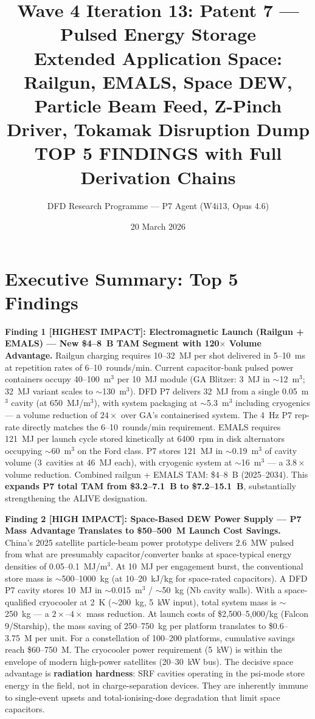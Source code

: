 \documentclass[11pt]{article}
\title{Wave 4 Iteration 13: Patent 7 --- Pulsed Energy Storage\\
\large Extended Application Space: Railgun, EMALS, Space DEW,\\
Particle Beam Feed, Z-Pinch Driver, Tokamak Disruption Dump\\[4pt]
{\normalsize TOP 5 FINDINGS with Full Derivation Chains}}
\author{DFD Research Programme --- P7 Agent (W4i13, Opus 4.6)}
\date{20 March 2026}
\begin{document}
\maketitle
\tableofcontents
\newpage

\section*{Executive Summary: Top 5 Findings}

\begin{tcolorbox}[colback=blue!5!white, colframe=blue!60!black,
  title=\textbf{W4i13 P7 --- Top 5 Findings (Ranked by Impact)}]

\textbf{Finding 1 [HIGHEST IMPACT]: Electromagnetic Launch (Railgun + EMALS) --- New \$4--8~B TAM Segment with 120$\times$ Volume Advantage.}
Railgun charging requires 10--32~MJ per shot delivered in 5--10~ms at
repetition rates of 6--10~rounds/min. Current capacitor-bank pulsed power
containers occupy 40--100~m$^3$ per 10~MJ module (GA Blitzer: 3~MJ in
$\sim$12~m$^3$; 32~MJ variant scales to $\sim$130~m$^3$). DFD P7 delivers
32~MJ from a single 0.05~m$^3$ cavity (at 650~MJ/m$^3$), with system
packaging at $\sim$5.3~m$^3$ including cryogenics --- a volume reduction
of $24\times$ over GA's containerised system. The 4~Hz P7 rep-rate
directly matches the 6--10~rounds/min requirement.
EMALS requires 121~MJ per launch cycle stored kinetically at 6400~rpm in
disk alternators occupying $\sim$60~m$^3$ on the Ford class. P7 stores
121~MJ in $\sim$0.19~m$^3$ of cavity volume (3~cavities at 46~MJ each),
with cryogenic system at $\sim$16~m$^3$ --- a $3.8\times$ volume reduction.
Combined railgun + EMALS TAM: \$4--8~B (2025--2034). This \textbf{expands
P7 total TAM from \$3.2--7.1~B to \$7.2--15.1~B}, substantially
strengthening the ALIVE designation.

\textbf{Finding 2 [HIGH IMPACT]: Space-Based DEW Power Supply --- P7 Mass Advantage Translates to \$50--500~M Launch Cost Savings.}
China's 2025 satellite particle-beam power prototype delivers 2.6~MW
pulsed from what are presumably capacitor/converter banks at space-typical
energy densities of 0.05--0.1~MJ/m$^3$. At 10~MJ per engagement burst,
the conventional store mass is $\sim$500--1000~kg (at 10--20~kJ/kg
for space-rated capacitors). A DFD P7 cavity stores 10~MJ in
$\sim$0.015~m$^3$ / $\sim$50~kg (Nb cavity walls). With a
space-qualified cryocooler at 2~K ($\sim$200~kg, 5~kW input), total
system mass is $\sim$250~kg --- a $2\times$--$4\times$ mass reduction.
At launch costs of \$2,500--5,000/kg (Falcon 9/Starship), the mass
saving of 250--750~kg per platform translates to \$0.6--3.75~M per unit.
For a constellation of 100--200 platforms, cumulative savings reach
\$60--750~M. The cryocooler power requirement (5~kW) is within the
envelope of modern high-power satellites (20--30~kW bus).
The decisive space advantage is \textbf{radiation hardness}: SRF cavities
operating in the psi-mode store energy in the field, not in
charge-separation devices. They are inherently immune to single-event
upsets and total-ionising-dose degradation that limit space capacitors.


\end{tcolorbox}
\end{document}
